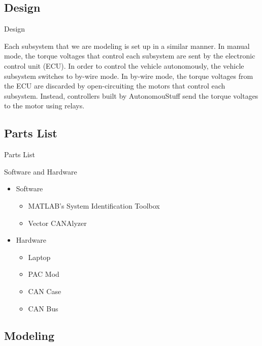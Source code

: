 \documentclass{beamer}
\begin{document}
\subsection{Design}

\begin{frame}{Design}
	\begin{block}{}
		Each subsystem that we are modeling is set up in a similar manner. In manual mode, the torque voltages that control each subsystem are sent by the electronic control unit (ECU). In order to control the vehicle autonomously, the vehicle subsystem switches to by-wire mode. In by-wire mode, the torque voltages from the ECU are discarded by open-circuiting the motors that control each subsystem. Instead, controllers built by AutonomouStuff send the torque voltages to the motor using relays.
	\end{block}
\end{frame}

\subsection{Parts List}

\begin{frame}{Parts List}
  \begin{block}{Software and Hardware}
 \begin{itemize}
        \item Software
        \begin{itemize}
        \small
        \item MATLAB's System Identification Toolbox
        \item Vector CANAlyzer
        \end{itemize}
	\item Hardware
	\begin{itemize}
	\small
	\item Laptop
	\item PAC Mod
	\item CAN Case 
	\item CAN Bus
	\end{itemize}
\end{itemize}
  \end{block}
\end{frame}

\subsection{Modeling}
\end{document}

